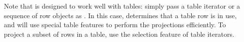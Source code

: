 Note that  is designed to work well with tables:
simply pass a table iterator or a sequence of row objects as
.  In this case,  determines that a table
row is in use, and will use special table features to perform the
projections efficiently.  To project a subset of rows in a table, use
the selection feature of table iterators.

